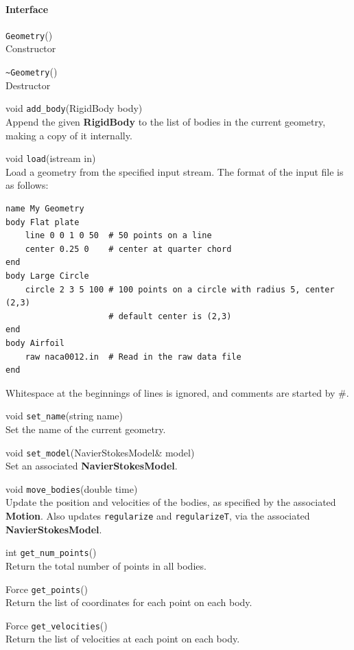 \documentclass[11pt]{article}
\def\class#1{{\bf #1}} %
\def\fn#1{{\tt #1}} %
\begin{document}
\paragraph{Interface}
\begin{description}
	\item \fn{Geometry}() \\
		Constructor
	\item \fn{\~\null Geometry}() \\
		Destructor
	\item void \fn{add\_body}(RigidBody body) \\
		Append the given \class{RigidBody} to the list of bodies in the current geometry, making a copy of it internally.
	\item void \fn{load}(istream in) \\
		Load a geometry from the specified input stream.  The format of the input file is as follows:
\begin{verbatim}
name My Geometry
body Flat plate
	line 0 0 1 0 50  # 50 points on a line
	center 0.25 0    # center at quarter chord
end
body Large Circle
	circle 2 3 5 100 # 100 points on a circle with radius 5, center (2,3)
					 # default center is (2,3)
end
body Airfoil
	raw naca0012.in  # Read in the raw data file
end
		\end{verbatim}
	 Whitespace at the beginnings of lines is ignored, and comments are started by \#.
	\item void \fn{set\_name}(string name) \\
		Set the name of the current geometry.
	\item void \fn{set\_model}(NavierStokesModel\& model) \\
		Set an associated \class{NavierStokesModel}.
	\item void \fn{move\_bodies}(double time) \\
		Update the position and velocities of the bodies, as specified by the associated \class{Motion}.  Also updates \fn{regularize} and \fn{regularizeT}, via the associated \class{NavierStokesModel}.
	\item int \fn{get\_num\_points}() \\
		Return the total number of points in all bodies.
	\item Force \fn{get\_points}() \\
		Return the list of coordinates for each point on each body.
	\item Force \fn{get\_velocities}() \\
		Return the list of velocities at each point on each body.		
\end{description}
\end{document}
